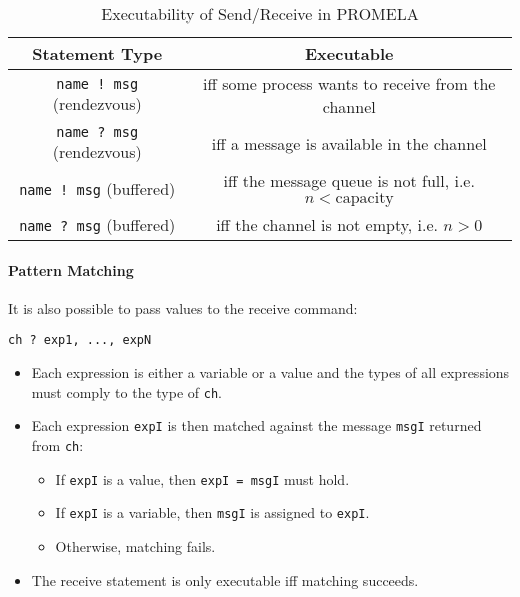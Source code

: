 \documentclass[a4paper, 11pt, accentcolor = tud3b]{tudreport}
\newcommand{\inlinePromela}[1]{\lstinline[language = PROMELA]|#1|}
\begin{document}
					\begin{table}[h]
						\centering
						\begin{tabular}{c | c}
							        \textbf{Statement Type}         & \textbf{Executable}                                                 \\ \hline
							\inlinePromela{name ! msg} (rendezvous) & iff some process wants to receive from the channel                  \\
							\inlinePromela{name ? msg} (rendezvous) & iff a message is available in the channel                           \\
							 \inlinePromela{name ! msg} (buffered)  & iff the message queue is not full, i.e. \( n < \textrm{capacity} \) \\
							 \inlinePromela{name ? msg} (buffered)  & iff the channel is not empty, i.e. \( n > 0 \)
						\end{tabular}
						\caption{Executability of Send/Receive in PROMELA}
						\label{tab:promelaExecCh}
					\end{table}

					\paragraph{Pattern Matching}
						It is also possible to pass values to the receive command:
						\begin{center}
							\inlinePromela{ch ? exp1, ..., expN}
						\end{center}
						\begin{itemize}
							\item Each expression is either a variable or a value and the types of all expressions must comply to the type of \inlinePromela{ch}.
							\item Each expression \inlinePromela{expI} is then matched against the message \inlinePromela{msgI} returned from \inlinePromela{ch}:
								\begin{itemize}
									\item If \inlinePromela{expI} is a value, then \inlinePromela{expI = msgI} must hold.
									\item If \inlinePromela{expI} is a variable, then \inlinePromela{msgI} is assigned to \inlinePromela{expI}.
									\item Otherwise, matching fails.
								\end{itemize}
							\item The receive statement is only executable iff matching succeeds.
						\end{itemize}
\end{document}
